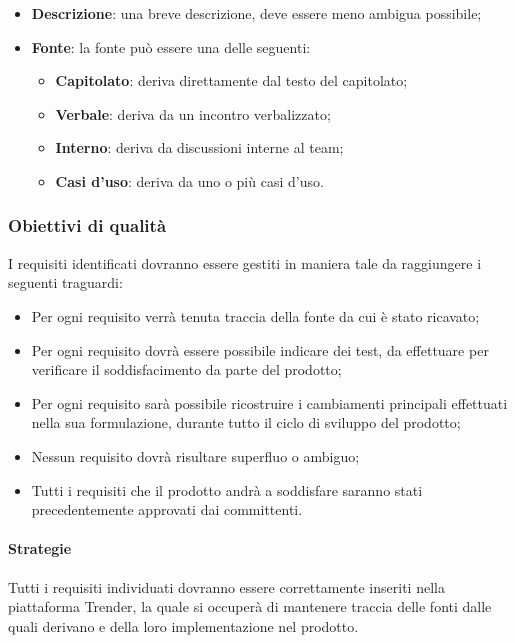 \documentclass[../NormeDiProgetto.tex]{subfiles}
\begin{document}
                  \begin{itemize}
                        \item \textbf{Descrizione}: una breve descrizione, deve essere meno ambigua possibile;
                        \item \textbf{Fonte}: la fonte può essere una delle seguenti:
                        \begin{itemize}
                              \item \textbf{Capitolato}: deriva direttamente dal testo del capitolato;
                              \item \textbf{Verbale}: deriva da un incontro verbalizzato;
                              \item \textbf{Interno}: deriva da discussioni interne al team;
                              \item \textbf{Casi d'uso}: deriva da uno o più casi d'uso.
                        \end{itemize}
                  \end{itemize}
                  
            \subsubsection{Obiettivi di qualità}
			I requisiti identificati dovranno essere gestiti in maniera tale da raggiungere i seguenti traguardi:
			\begin{itemize}
				\item Per ogni requisito verrà tenuta traccia della fonte da cui è stato ricavato;
				\item Per ogni requisito dovrà essere possibile indicare dei test, da effettuare per verificare il soddisfacimento da parte del prodotto;
				\item Per ogni requisito sarà possibile ricostruire i cambiamenti principali effettuati nella sua formulazione, durante tutto il ciclo di sviluppo del prodotto;
				\item Nessun requisito dovrà risultare superfluo o ambiguo;
				\item Tutti i requisiti che il prodotto andrà a soddisfare saranno stati precedentemente approvati dai committenti.
			\end{itemize}
			
				\paragraph{Strategie}
				Tutti i requisiti individuati dovranno essere correttamente inseriti nella piattaforma Trender, la quale si occuperà di mantenere traccia delle fonti dalle quali derivano e della loro implementazione nel prodotto.
			
\end{document}

